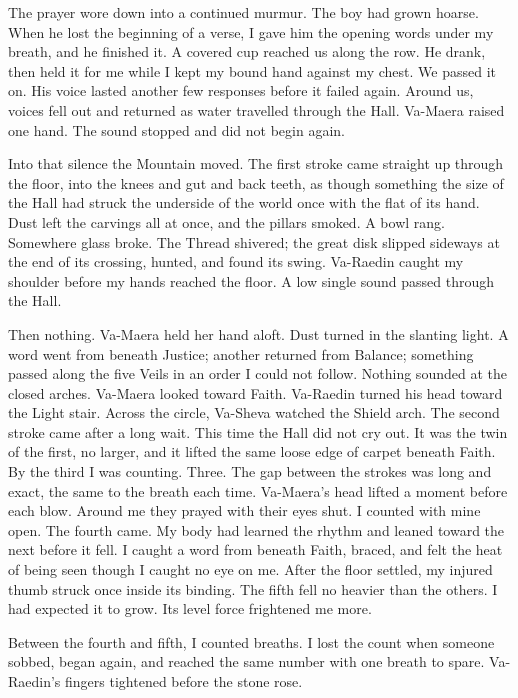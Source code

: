 The prayer wore down into a continued murmur. The boy had grown hoarse. When he lost the beginning of a verse, I gave him the opening words under my breath, and he finished it. A covered cup reached us along the row. He drank, then held it for me while I kept my bound hand against my chest. We passed it on. His voice lasted another few responses before it failed again. Around us, voices fell out and returned as water travelled through the Hall. Va-Maera raised one hand. The sound stopped and did not begin again.\par

Into that silence the Mountain moved. The first stroke came straight up through the floor, into the knees and gut and back teeth, as though something the size of the Hall had struck the underside of the world once with the flat of its hand. Dust left the carvings all at once, and the pillars smoked. A bowl rang. Somewhere glass broke. The Thread shivered; the great disk slipped sideways at the end of its crossing, hunted, and found its swing. Va-Raedin caught my shoulder before my hands reached the floor. A low single sound passed through the Hall.\par

Then nothing. Va-Maera held her hand aloft. Dust turned in the slanting light. A word went from beneath Justice; another returned from Balance; something passed along the five Veils in an order I could not follow. Nothing sounded at the closed arches. Va-Maera looked toward Faith. Va-Raedin turned his head toward the Light stair. Across the circle, Va-Sheva watched the Shield arch. The second stroke came after a long wait. This time the Hall did not cry out. It was the twin of the first, no larger, and it lifted the same loose edge of carpet beneath Faith. By the third I was counting. Three. The gap between the strokes was long and exact, the same to the breath each time. Va-Maera's head lifted a moment before each blow. Around me they prayed with their eyes shut. I counted with mine open. The fourth came. My body had learned the rhythm and leaned toward the next before it fell. I caught a word from beneath Faith, braced, and felt the heat of being seen though I caught no eye on me. After the floor settled, my injured thumb struck once inside its binding. The fifth fell no heavier than the others. I had expected it to grow. Its level force frightened me more.\par

Between the fourth and fifth, I counted breaths. I lost the count when someone sobbed, began again, and reached the same number with one breath to spare. Va-Raedin's fingers tightened before the stone rose.\par

